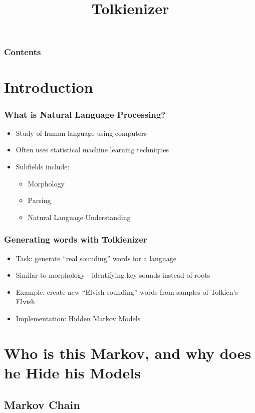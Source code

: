 \documentclass{beamer}
\title[Tolkienizer]{Tolkienizer}
\begin{document}
\begin{frame}
\titlepage
\end{frame}

\begin{frame}
   \frametitle{Contents}
   \tableofcontents[pausesections]
\end{frame}

\section{Introduction}

\begin{frame}
   \frametitle{What is Natural Language Processing?}
   \begin{itemize}
      \item Study of human language using computers
      \item Often uses statistical machine learning techniques
      \item Subfields include:
      \begin{itemize}
         \item Morphology
         \item Parsing
         \item Natural Language Understanding
      \end{itemize}
   \end{itemize}
\end{frame}

\begin{frame}
   \frametitle{Generating words with Tolkienizer}
   \begin{itemize}
      \item Task: generate ``real sounding'' words for a language
      \item Similar to morphology - identifying key sounds instead of roots
      \item Example: create new ``Elvish sounding'' words from samples of Tolkien's Elvish
      \item Implementation: Hidden Markov Models
   \end{itemize}
\end{frame}

\section{Who is this Markov, and why does he Hide his Models}

\subsection{Markov Chain}
\end{document}
